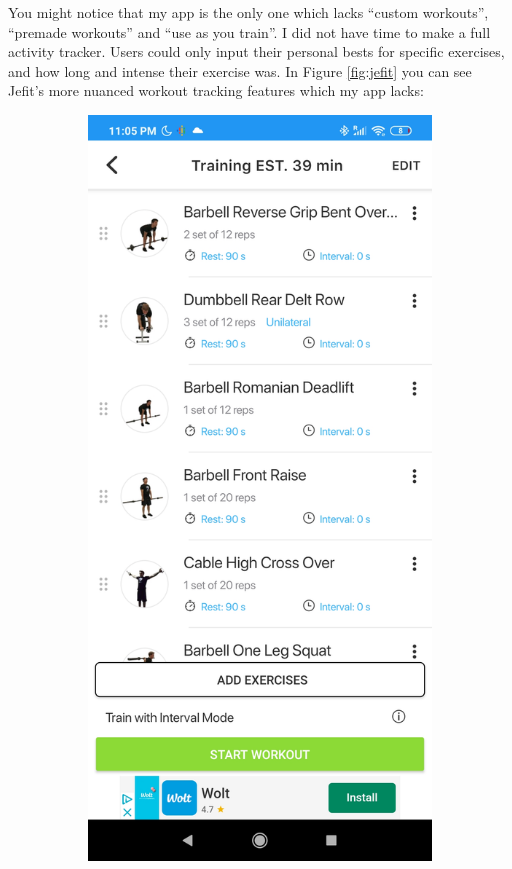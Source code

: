 \documentclass{l4proj}
\begin{document}
You might notice that my app is the only one which lacks ``custom workouts'', ``premade workouts'' and ``use as you train''. I did not have time to make a full activity tracker. Users could only input their personal bests for specific exercises, and how long and intense their exercise was. In Figure \ref{fig:jefit} you can see Jefit's more nuanced workout tracking features which my app lacks:
\begin{figure}[H]
    \centering
    \begin{subfigure}{0.3\textwidth}
        \includegraphics[width=\textwidth]{jefit_1.png}

\end{subfigure}
\end{figure}
\end{document}
